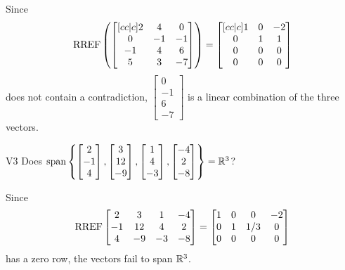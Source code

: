 \documentclass{sbgLAexam}
\begin{document}
\begin{solution}
  Since
  \[
    \operatorname{RREF}\left(
      \begin{bmatrix}[cc|c]
        2 & 4 & 0 \\
        0 & -1 & -1 \\
        -1 & 4 & 6 \\
        5 & 3 & -7
      \end{bmatrix}
    \right) =
    \begin{bmatrix}[cc|c]
      1 & 0 & -2 \\
      0 & 1 & 1 \\
      0 & 0 & 0 \\
      0 & 0 & 0
    \end{bmatrix}
  \]
  does not contain a contradiction,
  \(\begin{bmatrix} 0 \\ -1 \\ 6 \\ -7 \end{bmatrix}\) is
  a linear combination of the three vectors.
\end{solution}


\begin{extract}\newpage\end{extract}
\begin{problem}{V3}
Does
\(
  \operatorname{span}\left\{
    \begin{bmatrix} 2 \\ -1 \\ 4 \end{bmatrix},
    \begin{bmatrix} 3 \\ 12 \\ -9 \end{bmatrix},
    \begin{bmatrix} 1 \\ 4 \\ -3 \end{bmatrix},
    \begin{bmatrix} -4 \\ 2 \\ -8 \end{bmatrix}
  \right\} = \mathbb{R}^3
\)?
\end{problem}
\begin{solution}
Since
\[
  \operatorname{RREF}\begin{bmatrix}
    2 & 3 & 1 & -4 \\
    -1 & 12 & 4 & 2 \\
    4 & -9 & -3 & -8
  \end{bmatrix} =
  \begin{bmatrix}
    1 & 0 & 0 & -2 \\
    0 & 1 & 1/3 & 0 \\
    0 & 0 & 0 & 0
  \end{bmatrix}
\]
has a zero row, the vectors fail to span \(\mathbb{R}^3\).
\end{solution}
\end{document}
